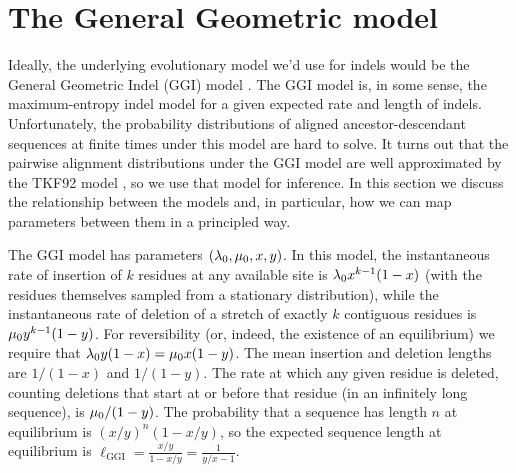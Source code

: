 %
%

\section{The General Geometric model}
\label{sec:ggi-tkf92}

Ideally, the underlying evolutionary model we'd use for indels would be the General Geometric Indel (GGI) model \cite{Holmes2020,DeMaio2020}.
The GGI model is, in some sense, the maximum-entropy indel model for a given
expected rate and length of indels.
Unfortunately, the probability distributions of aligned ancestor-descendant sequences
at finite times under this model are hard to solve.
It turns out that the pairwise alignment distributions under the GGI model are well approximated by the TKF92 model \cite{ThorneEtAl92}, so we use that model for inference.
In this section we discuss the relationship between the models
and, in particular, how we can map parameters between them in a principled way.

The GGI model has parameters $(\lambda_0,\mu_0,x,y)$.
In this model, the instantaneous rate of insertion of $k$
residues at any available site is $\lambda_0 x^{k-1} (1-x)$
(with the residues themselves sampled from a stationary distribution),
while the instantaneous rate of deletion of a stretch of exactly $k$ contiguous residues
is $\mu_0 y^{k-1} (1-y)$.
For reversibility (or, indeed, the existence of an equilibrium) we require that
$\lambda_0 y (1-x) = \mu_0 x (1-y)$.
The mean insertion and deletion lengths are $1/(1-x)$ and $1/(1-y)$.
The rate at which any given residue is deleted,
counting deletions that start at or before that residue (in an infinitely long sequence),
is $\mu_0 / (1-y)$.
The probability that a sequence has length $n$ at equilibrium is $(x/y)^n(1-x/y)$,
so the expected sequence length at equilibrium
is $\ell_{\mathrm{GGI}} = \frac{x/y}{1-x/y} = \frac{1}{y/x-1}$.

